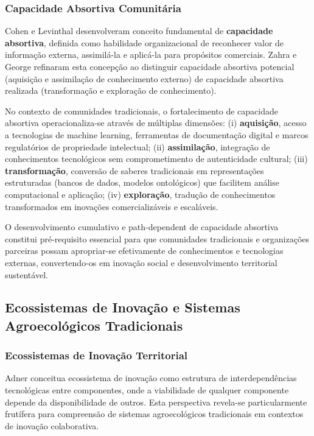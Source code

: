 \subsubsection{Capacidade Absortiva Comunitária}

Cohen e Levinthal \cite{CohenLevinthal1990} desenvolveram conceito fundamental de \textbf{capacidade absortiva}, definida como habilidade organizacional de reconhecer valor de informação externa, assimilá-la e aplicá-la para propósitos comerciais. Zahra e George \cite{Zahra2002} refinaram esta concepção ao distinguir capacidade absortiva potencial (aquisição e assimilação de conhecimento externo) de capacidade absortiva realizada (transformação e exploração de conhecimento).

No contexto de comunidades tradicionais, o fortalecimento de capacidade absortiva operacionaliza-se através de múltiplas dimensões: (i) \textbf{aquisição}, acesso a tecnologias de machine learning, ferramentas de documentação digital e marcos regulatórios de propriedade intelectual; (ii) \textbf{assimilação}, integração de conhecimentos tecnológicos sem comprometimento de autenticidade cultural; (iii) \textbf{transformação}, conversão de saberes tradicionais em representações estruturadas (bancos de dados, modelos ontológicos) que facilitem análise computacional e aplicação; (iv) \textbf{exploração}, tradução de conhecimentos transformados em inovações comercializáveis e escaláveis.

O desenvolvimento cumulativo e path-dependent de capacidade absortiva constitui pré-requisito essencial para que comunidades tradicionais e organizações parceiras possam apropriar-se efetivamente de conhecimentos e tecnologias externas, convertendo-os em inovação social e desenvolvimento territorial sustentável.

\subsection{Ecossistemas de Inovação e Sistemas Agroecológicos Tradicionais}

\subsubsection{Ecossistemas de Inovação Territorial}

Adner \cite{Adner2006} conceitua ecossistema de inovação como estrutura de interdependências tecnológicas entre componentes, onde a viabilidade de qualquer componente depende da disponibilidade de outros. Esta perspectiva revela-se particularmente frutífera para compreensão de sistemas agroecológicos tradicionais em contextos de inovação colaborativa.


